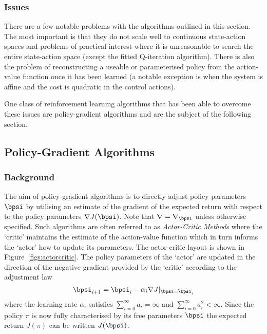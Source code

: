 \subsubsection{Issues}
There are a few notable problems with the algorithms outlined in this section. The most important is that they do not scale well to continuous state-action spaces and problems of practical interest where it is unreasonable to search the entire state-action space (except the fitted Q-iteration algorithm). There is also the problem of reconstructing a useable or parameterised policy from the action-value function once it has been learned (a notable exception is when the system is affine and the cost is quadratic in the control actions).

One class of reinforcement learning algorithms that has been able to overcome these issues are policy-gradient algorithms and are the subject of the following section.







\subsection{Policy-Gradient Algorithms}
\subsubsection{Background}
The aim of policy-gradient algorithms is to directly adjust policy parameters $\bpsi$ by utilising an estimate of the gradient of the expected return with respect to the policy parameters $\nabla  J(\bpsi)$. Note that $\nabla = \nabla_{\bpsi}$ unless otherwise specified. Such algorithms are often referred to as \textit{Actor-Critic Methods} where the `critic' maintains the estimate of the action-value function which in turn informs the `actor' how to update its parameters. The actor-critic layout is shown in Figure~\ref{figs:actorcritic}. The policy parameters of the `actor' are updated in the direction of the negative gradient provided by the `critic' according to the adjustment law
\begin{equation}
\bpsi_{i+1} = \bpsi_{i} - \alpha_i \nabla J|_{\bpsi=\bpsi_i}
\end{equation}
where the learning rate $\alpha_i$ satisfies $\sum_{i=0}^{\infty} a_i = \infty$ and $\sum_{i=0}^{\infty} a_i^2 < \infty$. Since the policy $\pi$ is now fully characterised by its free parameters $\bpsi$ the expected return $J(\pi)$ can be written $J(\bpsi)$.

